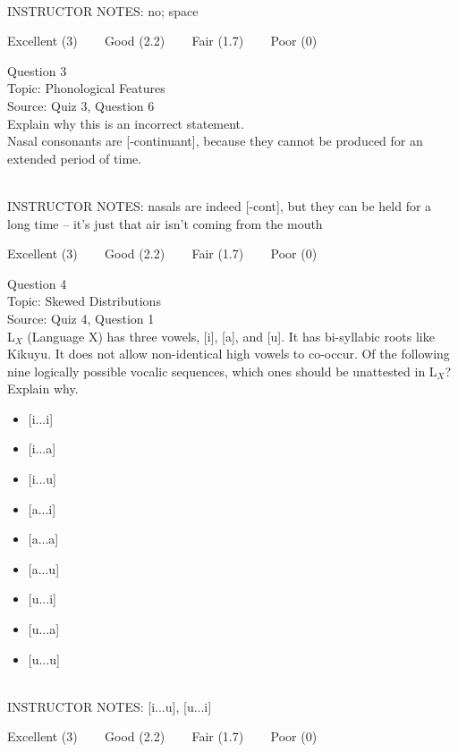 \documentclass[12pt]{article}
\begin{document}
~\\
INSTRUCTOR NOTES: no; space


\vfill
Excellent (3) ~~~ Good (2.2) ~~~ Fair (1.7) ~~~ Poor (0)
\newpage

{\large Question 3}\\

Topic: Phonological Features\\
Source: Quiz 3, Question 6\\

Explain why this is an incorrect statement.\\

Nasal consonants are {[-continuant]}, because they cannot be produced for an extended period of time.


~\\
INSTRUCTOR NOTES: nasals are indeed [-cont], but they can be held for a long time -- it's just that air isn't coming from the mouth


\vfill
Excellent (3) ~~~ Good (2.2) ~~~ Fair (1.7) ~~~ Poor (0)
\newpage

{\large Question 4}\\

Topic: Skewed Distributions\\
Source: Quiz 4, Question 1\\

L$_X$ (Language X) has three vowels, [i], [a], and [u]. It has bi-syllabic roots like Kikuyu. It does not allow non-identical high vowels to co-occur. Of the following nine logically possible vocalic sequences, which ones should be unattested in L$_X$? Explain why.\\

\begin{itemize} \item {[i...i]} \item {[i...a]} \item {[i...u]} \item {[a...i]} \item {[a...a]} \item {[a...u]} \item {[u...i]} \item {[u...a]} \item {[u...u]} \end{itemize}


~\\
INSTRUCTOR NOTES: [i...u], [u...i]


\vfill
Excellent (3) ~~~ Good (2.2) ~~~ Fair (1.7) ~~~ Poor (0)
\newpage
\end{document}
